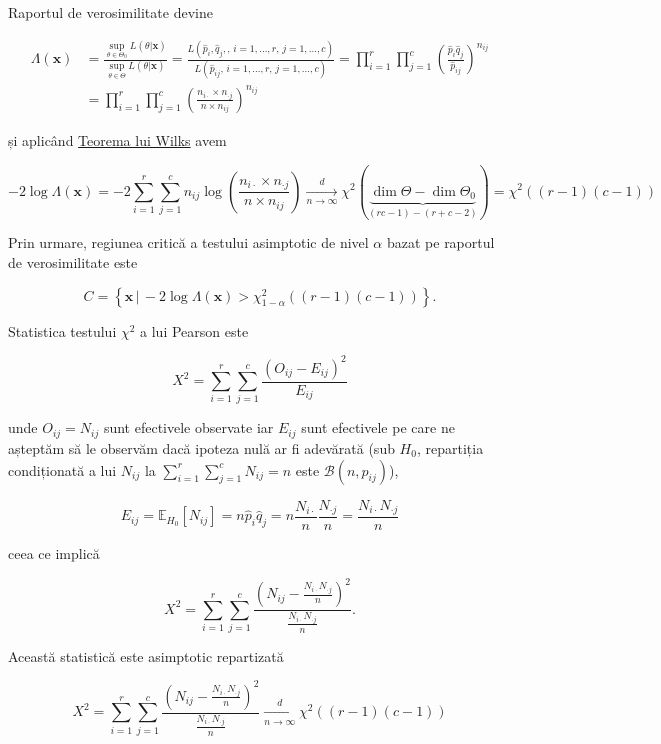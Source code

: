 \documentclass[]{article}
\begin{document}
Raportul de verosimilitate devine

\begin{align*}
  \Lambda(\mathbf{x})&=\frac{\sup_{\theta\in\Theta_0}L(\theta|\mathbf{x})}{\sup_{\theta\in\Theta}L(\theta|\mathbf{x})} = \frac{L(\hat{p}_i, \hat{q}_{j},,\,i = 1,\ldots, r,\, j = 1,\ldots,c)}{L(\hat{p}_{ij},\,i = 1,\ldots, r,\, j = 1,\ldots,c)}= \prod_{i = 1}^{r}\prod_{j = 1}^{c} \left(\frac{\hat{p}_{i}\hat{q}_{j}}{\hat{p}_{ij}}\right)^{n_{ij}} \\
  &= \prod_{i = 1}^{r}\prod_{j = 1}^{c} \left(\frac{n_{i\cdot}\times n_{\cdot j}}{n\times n_{ij}}\right)^{n_{ij}}
\end{align*}

și aplicând
\href{https://en.wikipedia.org/wiki/Likelihood-ratio_test}{Teorema lui
Wilks} avem

\[
  -2\log \Lambda(\mathbf{x}) = -2\sum_{i = 1}^{r}\sum_{j = 1}^{c} n_{ij}\log\left(\frac{n_{i\cdot}\times n_{\cdot j}}{n\times n_{ij}}\right) \underset{n\to\infty}{\overset{d}{\longrightarrow}}\chi^2(\underbrace{\dim{\Theta} - \dim{\Theta_0}}_{(rc-1)-(r+c-2)}) = \chi^2((r-1)(c-1))
\]

Prin urmare, regiunea critică a testului asimptotic de nivel \(\alpha\)
bazat pe raportul de verosimilitate este

\[
  C = \left\{\mathbf{x} \,|\, -2\log \Lambda(\mathbf{x}) > \chi^2_{1-\alpha}((r-1)(c-1))\right\}.
\]

Statistica testului \(\chi^2\) a lui Pearson este

\[
  X^2 = \sum_{i = 1}^{r}\sum_{j = 1}^{c}\frac{(O_{ij} - E_{ij})^2}{E_{ij}}
\]

unde \(O_{ij} = N_{ij}\) sunt efectivele observate iar \(E_{ij}\) sunt
efectivele pe care ne așteptăm să le observăm dacă ipoteza nulă ar fi
adevărată (sub \(H_0\), repartiția condiționată a lui \(N_{ij}\) la
\(\sum_{i = 1}^{r}\sum_{j = 1}^{c}N_{ij} = n\) este
\(\mathcal{B}(n,p_{ij})\)),

\[
  E_{ij} = \mathbb{E}_{H_0}[N_{ij}] = n \hat{p}_i \hat{q}_j = n \frac{N_{i\cdot}}{n}\frac{N_{\cdot j}}{n} = \frac{N_{i\cdot}N_{\cdot j}}{n}
\]

ceea ce implică

\[
  X^2 = \sum_{i = 1}^{r}\sum_{j = 1}^{c}\frac{\left(N_{ij} - \frac{N_{i\cdot}N_{\cdot j}}{n}\right)^2}{\frac{N_{i\cdot}N_{\cdot j}}{n}}.
\]

Această statistică este asimptotic repartizată

\[
  X^2 = \sum_{i = 1}^{r}\sum_{j = 1}^{c}\frac{\left(N_{ij} - \frac{N_{i\cdot}N_{\cdot j}}{n}\right)^2}{\frac{N_{i\cdot}N_{\cdot j}}{n}} \underset{n\to\infty}{\overset{d}{\longrightarrow}} \chi^2((r-1)(c-1))
\]
\end{document}
